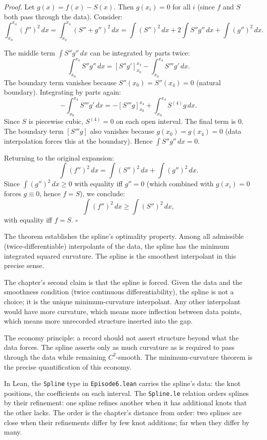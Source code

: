 \emph{Proof.} Let $g(x) = f(x) - S(x)$. Then $g(x_i) = 0$ for all $i$
(since $f$ and $S$ both pass through the data). Consider:
\[
\int_{x_0}^{x_4} (f'')^2 \, dx = \int_{x_0}^{x_4} (S'' + g'')^2 \, dx =
\int (S'')^2 \, dx + 2 \int S'' g'' \, dx + \int (g'')^2 \, dx.
\]

The middle term $\int S'' g'' \, dx$ can be integrated by parts twice:
\[
\int_{x_0}^{x_4} S'' g'' \, dx = [S'' g']_{x_0}^{x_4} - \int_{x_0}^{x_4}
S''' g' \, dx.
\]
The boundary term vanishes because $S''(x_0) = S''(x_4) = 0$ (natural
boundary). Integrating by parts again:
\[
- \int_{x_0}^{x_4} S''' g' \, dx = -[S''' g]_{x_0}^{x_4} + \int_{x_0}^{x_4}
S^{(4)} g \, dx.
\]
Since $S$ is piecewise cubic, $S^{(4)} = 0$ on each open interval. The
final term is $0$. The boundary term $[S''' g]$ also vanishes because
$g(x_0) = g(x_4) = 0$ (data interpolation forces this at the boundary).
Hence $\int S'' g'' \, dx = 0$.

Returning to the original expansion:
\[
\int (f'')^2 \, dx = \int (S'')^2 \, dx + \int (g'')^2 \, dx.
\]
Since $\int (g'')^2 \, dx \ge 0$ with equality iff $g'' = 0$
(which combined with $g(x_i) = 0$ forces $g \equiv 0$, hence $f = S$),
we conclude:
\[
\int (f'')^2 \, dx \ge \int (S'')^2 \, dx,
\]
with equality iff $f = S$. $\square$

The theorem establishes the spline's optimality property. Among all
admissible (twice-differentiable) interpolants of the data, the
spline has the minimum integrated squared curvature. The spline is
the smoothest interpolant in this precise sense.

The chapter's second claim is that the spline is forced. Given the
data and the smoothness condition (twice continuous
differentiability), the spline is not a choice; it is the unique
minimum-curvature interpolant. Any other interpolant would have more
curvature, which means more inflection between data points, which
means more unrecorded structure inserted into the gap.

The economy principle: a record should not assert structure beyond
what the data forces. The spline asserts only as much curvature as
is required to pass through the data while remaining
$C^2$-smooth. The minimum-curvature theorem is the precise
quantification of this economy.

In Lean, the \texttt{Spline} type in \texttt{Episode6.lean} carries
the spline's data: the knot positions, the coefficients on each
interval. The \texttt{Spline.le} relation orders splines by their
refinement: one spline refines another when it has additional knots
that the other lacks. The order is the chapter's distance from
order: two splines are close when their refinements differ by few
knot additions; far when they differ by many.

